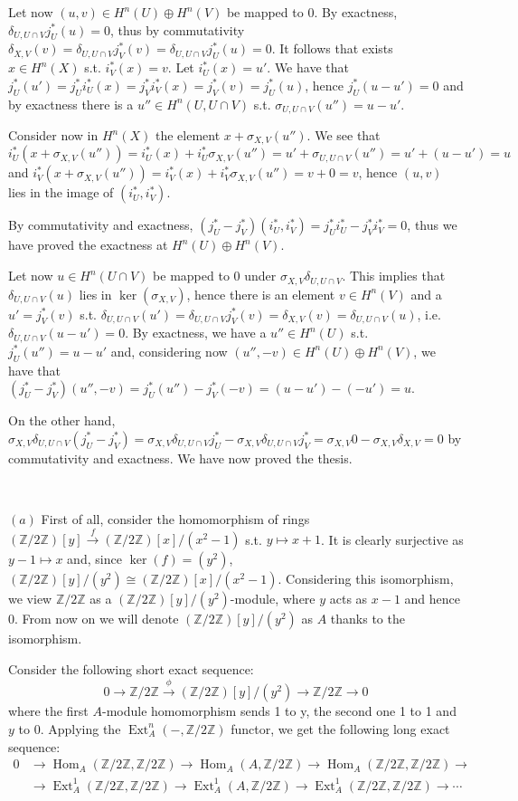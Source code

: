 \documentclass{article}
\newcommand{\numberset}{\mathbb}
\newcommand{\Z}{\numberset{Z}}
\newcommand{\exercise}[1]{\noindent {\bf Exercise #1}}
\DeclareMathOperator{\Hom}{Hom}
\DeclareMathOperator{\Ext}{Ext}
\begin{document}
Let now $(u,v)\in H^n(U)\oplus H^n(V)$ be mapped to 0. By exactness,
$\delta_{U,U\cap V}j^*_U(u)=0$, thus by commutativity $\delta_{X,V}(v)=\delta_{U,U\cap
V}j^*_V(v)=\delta_{U,U\cap V}j^*_U(u)=0$. It follows that exists $x\in H^n(X)$
s.t. $i^*_V(x)=v$. Let $i^*_U(x)=u'$. We have that $j^*_U(u')=j^*_Ui^*_U(x)=
j^*_Vi^*_V(x)=j^*_V(v)=j^*_U(u)$, hence $j^*_U(u-u')=0$ and by exactness there
is a $u''\in H^n(U,U\cap V)$ s.t. $\sigma_{U,U\cap V}(u'')=u-u'$.

Consider now in $H^n(X)$ the element $x+\sigma_{X,V}(u'')$. We see that
$i^*_U(x+\sigma_{X,V}(u''))=i^*_U(x)+i^*_U\sigma_{X,V}(u'')=u'+\sigma_{U,U\cap
V}(u'')=u'+(u-u')=u$ and
$i^*_V(x+\sigma_{X,V}(u''))=i^*_V(x)+i^*_V\sigma_{X,V}(u'')=v+0=v$, hence
$(u,v)$ lies in the image of $(i^*_U,i^*_V)$.

By commutativity and exactness, $(j^*_U-j^*_V)(i^*_U,i^*_V)=j^*_Ui^*_U-j^*_V
i^*_V=0$, thus we have proved the exactness at $H^n(U)\oplus H^n(V)$.

Let now $u\in H^n(U\cap V)$ be mapped to 0 under $\sigma_{X,V}\delta_{U,U\cap
V}$. This implies that $\delta_{U,U\cap V}(u)$ lies in $\ker(\sigma_{X,V})$,
hence there is an element $v\in H^n(V)$ and a $u'=j^*_V(v)$ s.t.
$\delta_{U,U\cap V}(u')=\delta_{U,U\cap
V}j^*_V(v)=\delta_{X,V}(v)=\delta_{U,U\cap V}(u)$, i.e. $\delta_{U,U\cap
V}(u-u')=0$. By exactness, we have a $u''\in H^n(U)$ s.t. $j^*_U(u'')=u-u'$ and,
considering now $(u'',-v)\in H^n(U)\oplus H^n(V)$, we have that
$(j^*_U-j^*_V)(u'',-v)=j^*_U(u'')-j^*_V(-v)=(u-u')-(-u')=u$.

On the other hand, $\sigma_{X,V}\delta_{U,U\cap
V}(j^*_U-j^*_V)=\sigma_{X,V}\delta_{U,U\cap V}j^*_U-\sigma_{X,V}\delta_{U,U\cap
V}j^*_V=\sigma_{X,V}0-\sigma_{X,V}\delta_{X,V}=0$ by commutativity and
exactness. We have now proved the thesis.


~\\
\exercise{5}

$(a)$ First of all, consider the homomorphism of rings
$(\Z/2\Z)[y]\xrightarrow{f}(\Z/2\Z)[x]/(x^2-1)$ s.t. $y\mapsto x+1$. It is
clearly surjective as $y-1\mapsto x$ and, since $\ker(f)=(y^2)$,
$(\Z/2\Z)[y]/(y^2)\cong (\Z/2\Z)[x]/(x^2-1)$. Considering this isomorphism, we
view $\Z/2\Z$ as a $(\Z/2\Z)[y]/(y^2)$-module, where $y$ acts as $x-1$ and hence
0. From now on we will denote $(\Z/2\Z)[y]/(y^2)$ as $A$ thanks to the
isomorphism.

Consider the following short exact sequence:
$$0\rightarrow\Z/2\Z\xrightarrow{\phi}(\Z/2\Z)[y]/(y^2)\rightarrow
\Z/2\Z\rightarrow 0$$
where the first $A$-module homomorphism sends 1 to y, the second one 1 to 1 and
$y$ to $0$. Applying the $\Ext^n_A(-,\Z/2\Z)$ functor, we get the following long
exact sequence:
\begin{align*}
    0 &\rightarrow \Hom_A(\Z/2\Z,\Z/2\Z)\rightarrow \Hom_A(A,\Z/2\Z)\rightarrow
    \Hom_A(\Z/2\Z,\Z/2\Z)\rightarrow \\
    &\rightarrow \Ext^1_A(\Z/2\Z,\Z/2\Z)\rightarrow \Ext^1_A(A,\Z/2\Z)\rightarrow
    \Ext^1_A(\Z/2\Z,\Z/2\Z)\rightarrow\cdots
\end{align*}
\end{document}
